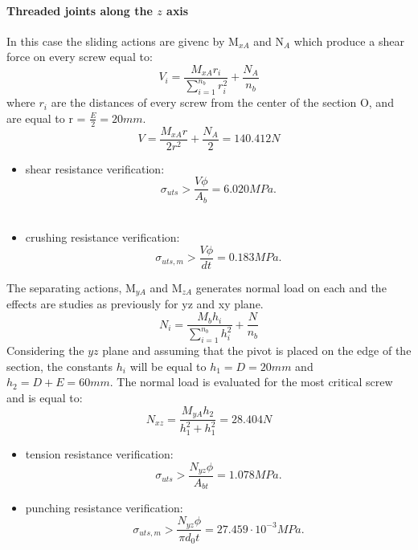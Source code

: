 \paragraph{Threaded joints along the $z$ axis} In this case the sliding actions are givenc by M$_{xA}$ and  N$_{A}$ which produce a shear force on every screw equal to:\\
\begin{equation*}
    V_{i} = \frac{M_{xA}r_{i}}{\sum\limits_{i=1}^{n_{{b}}} r^2_{i}} + \frac{N_{A}}{n_{b}}
\end{equation*}
where $r_{i}$ are the distances of every screw from the center of the section O, and are equal to r = $\frac{E}{2} = 20 mm$. 
\begin{equation*}
    V = \frac{M_{xA}r}{2r^2} +  \frac{N_{A}}{2} = 140.412 N
\end{equation*}
\begin{itemize}
    \item shear resistance verification:
    \begin{equation*}
       \sigma_{uts} > \frac{V\phi}{A_{b}} = 6.020 MPa.
    \end{equation*}\\
    \item crushing resistance verification:
     \begin{equation*}
       \sigma_{uts,m} > \frac{V\phi}{dt} = 0.183 MPa.
    \end{equation*}
\end{itemize}
The separating actions, M$_{yA}$ and M$_{zA}$ generates normal load on each and the effects are studies as previously for yz and xy plane.
\begin{equation*}
    N_{i} = \frac{M_{b}h_{i}}{\sum\limits_{i=1}^{n_{b}} h^2_{i}} + \frac{N}{n_{b}}
\end{equation*}
Considering the $yz$ plane and assuming that the pivot is placed on the edge of the section, the constants $h_{i}$ will be equal to $h_1 = D = 20 mm$ and $h_2 = D + E = 60 mm$.
The normal load is evaluated for the most critical screw and is equal to:
\begin{equation*}
    N_{xz} = \frac{M_{yA}h_{2}}{h_{1}^{2}+h_{1}^{2}} = 28.404 N
\end{equation*}
\begin{itemize}
    \item tension resistance verification:
     \begin{equation*}
       \sigma_{uts} > \frac{N_{yz}\phi}{A_{bt}} = 1.078 MPa.
    \end{equation*}
    \item punching resistance verification:
     \begin{equation*}
       \sigma_{uts,m} > \frac{N_{yz}\phi}{\pi d_{0}t} = 27.459 \cdot 10^{-3} MPa.
    \end{equation*}
\end{itemize}
